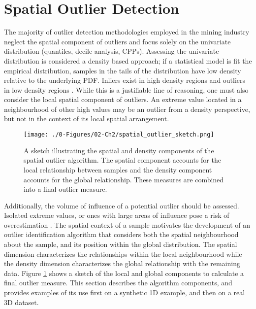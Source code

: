 \FloatBarrier
\section{Spatial Outlier Detection}
\label{sec:02spatial}

The majority of outlier detection methodologies employed in the mining industry neglect the spatial component of outliers and focus solely on the univariate distribution (quantiles, decile analysis, \glspl{CPP}). Assessing the univariate distribution is considered a density based approach; if a statistical model is fit the empirical distribution, samples in the tails of the distribution have low density relative to the underlying \gls{PDF}. Inliers exist in high density regions and outliers in low density regions \citep{geron2019hands}. While this is a justifiable line of reasoning, one must also consider the local spatial component of outliers. An extreme value located in a neighbourhood of other high values may be an outlier from a density perspective, but not in the context of its local spatial arrangement.

\begin{figure}[htb!]
    \centering
    \texttt{[image: ./0-Figures/02-Ch2/spatial\_outlier\_sketch.png]}
    \caption{A sketch illustrating the spatial and density components of the spatial outlier algorithm. The spatial component accounts for the local relationship between samples and the density component accounts for the global relationship. These measures are combined into a final outlier measure.}
    \label{fig:spatial_outlier_sketch}
\end{figure}


Additionally, the volume of influence of a potential outlier should be assessed. Isolated extreme values, or ones with large areas of influence pose a risk of overestimation \citep{leuangthong2015dealing}. The spatial context of a sample motivates the development of an outlier identification algorithm that considers both the spatial neighbourhood about the sample, and its position within the global distribution. The spatial dimension characterizes the relationships within the local neighbourhood while the density dimension characterizes the global relationship with the remaining data. Figure \ref{fig:spatial_outlier_sketch} shows a sketch of the local and global components to calculate a final outlier measure. This section describes the algorithm components, and provides examples of its use first on a synthetic \gls{1D} example, and then on a real \gls{3D} dataset.

